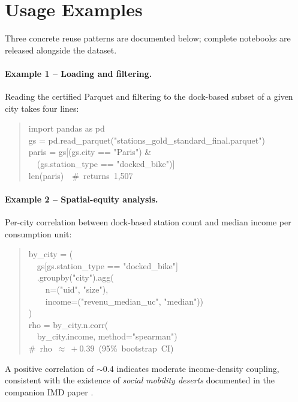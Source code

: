 \documentclass[11pt,a4paper]{article}
\begin{document}
\section*{Usage Examples}\label{secUsage}

Three concrete reuse patterns are documented below; complete notebooks
are released alongside the dataset.

\paragraph{Example 1 -- Loading and filtering.}
Reading the certified Parquet and filtering to the dock-based subset
of a given city takes four lines:
\begin{quote}\small\ttfamily
import pandas as pd\\
gs = pd.read\_parquet("stations\_gold\_standard\_final.parquet")\\
paris = gs[(gs.city == "Paris") \&\\
\ \ (gs.station\_type == "docked\_bike")]\\
len(paris)\ \ \#\ returns\ 1{,}507
\end{quote}

\paragraph{Example 2 -- Spatial-equity analysis.} Per-city correlation
between dock-based station count and median income per consumption
unit:
\begin{quote}\small\ttfamily
by\_city = (\\
\ \ gs[gs.station\_type == "docked\_bike"]\\
\ \ .groupby("city").agg(\\
\ \ \ \ n=("uid", "size"),\\
\ \ \ \ income=("revenu\_median\_uc", "median"))\\
)\\
rho = by\_city.n.corr(\\
\ \ by\_city.income, method="spearman")\\
\#\ rho\ $\approx\ +0.39$\ (95\%\ bootstrap\ CI)
\end{quote}
A positive correlation of $\sim$0.4 indicates moderate income-density
coupling, consistent with the existence of \emph{social mobility
deserts} documented in the companion IMD paper \cite{Fosse2026imd}.
\end{document}
